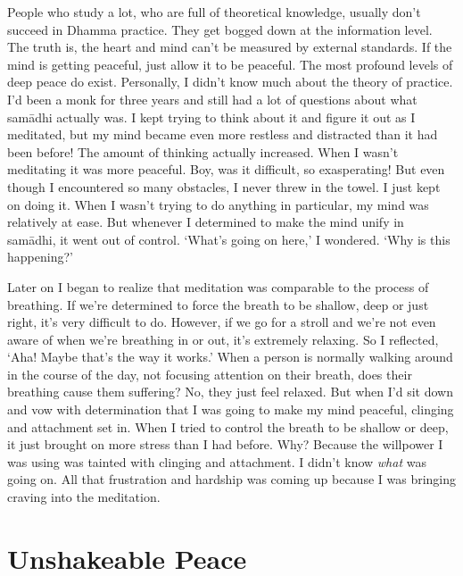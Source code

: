 People who study a lot, who are full of theoretical knowledge, usually don't succeed in Dhamma practice. They get bogged down at the information level. The truth is, the heart and mind can't be measured by external standards. If the mind is getting peaceful, just allow it to be peaceful. The most profound levels of deep peace do exist. Personally, I didn't know much about the theory of practice. I'd been a monk for three years and still had a lot of questions about what sam\=adhi actually was. I kept trying to think about it and figure it out as I meditated, but my mind became even more restless and distracted than it had been before! The amount of thinking actually increased. When I wasn't meditating it was more peaceful. Boy, was it difficult, so exasperating! But even though I encountered so many obstacles, I never threw in the towel. I just kept on doing it. When I wasn't trying to do anything in particular, my mind was relatively at ease. But whenever I determined to make the mind unify in sam\=adhi, it went out of control. `What's going on here,' I wondered. `Why is this happening?'

Later on I began to realize that meditation was comparable to the process of breathing. If we're determined to force the breath to be shallow, deep or just right, it's very difficult to do. However, if we go for a stroll and we're not even aware of when we're breathing in or out, it's extremely relaxing. So I reflected, `Aha! Maybe that's the way it works.' When a person is normally walking around in the course of the day, not focusing attention on their breath, does their breathing cause them suffering? No, they just feel relaxed. But when I'd sit down and vow with determination that I was going to make my mind peaceful, clinging and attachment set in. When I tried to control the breath to be shallow or deep, it just brought on more stress than I had before. Why? Because the willpower I was using was tainted with clinging and attachment. I didn't know \textit{what} was going on. All that frustration and hardship was coming up because I was bringing craving into the meditation.

\clearpage

\section{Unshakeable Peace}

